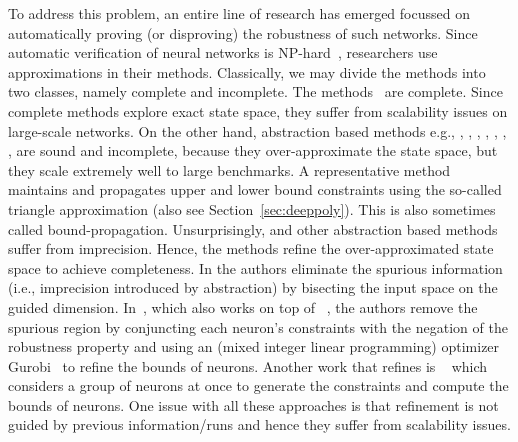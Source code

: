 To address this problem, an entire line of research has emerged focussed on automatically proving (or disproving) the robustness of such networks. Since automatic verification of neural networks is NP-hard~\cite{katz2021reluplex}, researchers use approximations in their methods. Classically, we may divide the methods into two classes, namely complete and incomplete. The methods~\cite{lomuscio2017approach,fischetti2018deep,dutta2018output,cheng2017maximum,katz2017reluplex,katz2019marabou,ehlers2017formal,huang2017safety,wang2021beta,xu2020fast,zhang2022general} are complete. Since complete methods explore exact state space, they suffer from scalability issues on large-scale networks. On the other hand, abstraction based methods e.g., \cite{dvijotham2018dual}, \cite{gehr2018ai2}, \cite{singh2018fast},  \cite{singh2018boosting}, \cite{weng2018towards}, \cite{wong2018provable}, \cite{zhang2018efficient}, \cite{zhang2018efficient} are sound and incomplete, because they over-approximate the state space, but they scale extremely well to large benchmarks. A representative method \deeppoly{}~\cite{singh2019abstract} maintains and propagates upper and lower bound constraints using the so-called triangle approximation (also see Section~\ref{sec:deeppoly}). This is also sometimes called bound-propagation. %
Unsurprisingly, \deeppoly{} and other abstraction based methods suffer from imprecision. Hence, the methods \cite{wang2018formal,wang2018efficient,elboher2020abstraction,yang2021improving,lin2020art} refine the over-approximated state space to achieve completeness. In \cite{wang2018formal,wang2018efficient,lin2020art} the authors eliminate the spurious information (i.e., imprecision introduced by abstraction) by bisecting the input space on the guided dimension. In~\cite{yang2021improving}, which also works on top of \deeppoly{}~\cite{singh2019abstract}, the authors remove the spurious region by  conjuncting each neuron's constraints with the negation of the robustness property and using an \milp{} (mixed integer linear programming) optimizer Gurobi~\cite{gurobioptimizer} to refine the bounds of neurons. Another work that refines
\deeppoly{} %
is \kpoly{}~\cite{singh2019beyond} which considers 
a group of neurons at once to generate the constraints and compute the bounds of neurons. One issue with all these approaches is that refinement is not guided by previous information/runs and hence they suffer from scalability issues.



